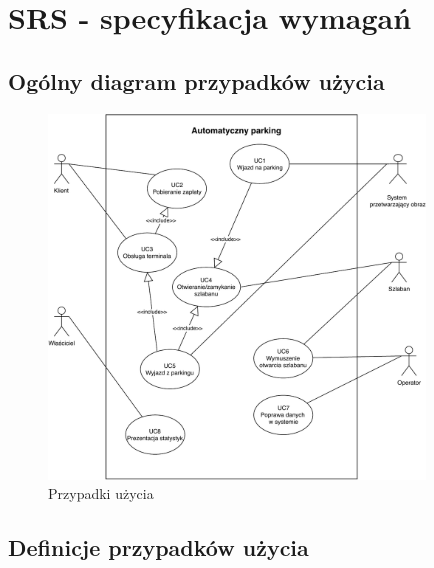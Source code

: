 \chapter{SRS - specyfikacja wymagań}

\section{Ogólny diagram przypadków użycia}

\begin{figure}[H]
	\centering
	\includegraphics[width=100mm]{diagramy/PrzypUzycia.pdf}
	\caption{Przypadki użycia \label{overflow}}
\end{figure}

\section{Definicje przypadków użycia}
